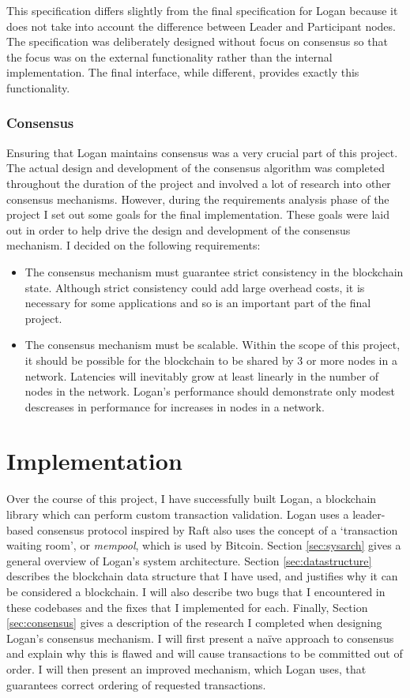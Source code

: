 \documentclass[12pt,a4paper,twoside,openright]{report}
\begin{document}
	This specification differs slightly from the final specification for Logan because it does not take into account the difference between Leader and Participant nodes.
	The specification was deliberately designed without focus on consensus so that the focus was on the external functionality rather than the internal implementation. 
	The final interface, while different, provides exactly this functionality.

	\subsection{Consensus}
	Ensuring that Logan maintains consensus was a very crucial part of this project. 
	The actual design and development of the consensus algorithm was completed throughout the duration of the project and involved a lot of research into other consensus mechanisms.
	However, during the requirements analysis phase of the project I set out some goals for the final implementation.
	These goals were laid out in order to help drive the design and development of the consensus mechanism. 
	I decided on the following requirements:
	\begin{itemize}
		\item The consensus mechanism must guarantee strict consistency in the blockchain state. 
		Although strict consistency could add large overhead costs, it is necessary for some applications and so is an important part of the final project.
		\item The consensus mechanism must be scalable. 
		Within the scope of this project, it should be possible for the blockchain to be shared by 3 or more nodes in a network. 
		Latencies will inevitably grow at least linearly in the number of nodes in the network.
		Logan's performance should demonstrate only modest descreases in performance for increases in nodes in a network.
	\end{itemize}

	\chapter{Implementation} \label{Implementation}
	Over the course of this project, I have successfully built Logan, a blockchain library which can perform custom transaction validation.
	Logan uses a leader-based consensus protocol inspired by Raft also uses the concept of a `transaction waiting room', or \textit{mempool}, which is used by Bitcoin.
	Section \ref{sec:sysarch} gives a general overview of Logan's system architecture.
	Section \ref{sec:datastructure} describes the blockchain data structure that I have used, and justifies why it can be considered a blockchain.
	I will also describe two bugs that I encountered in these codebases and the fixes that I implemented for each.
	Finally, Section \ref{sec:consensus} gives a description of the research I completed when designing Logan's consensus mechanism. 
	I will first present a na\"{i}ve approach to consensus and explain why this is flawed and will cause transactions to be committed out of order.
	I will then present an improved mechanism, which Logan uses, that guarantees correct ordering of requested transactions.
\end{document}
